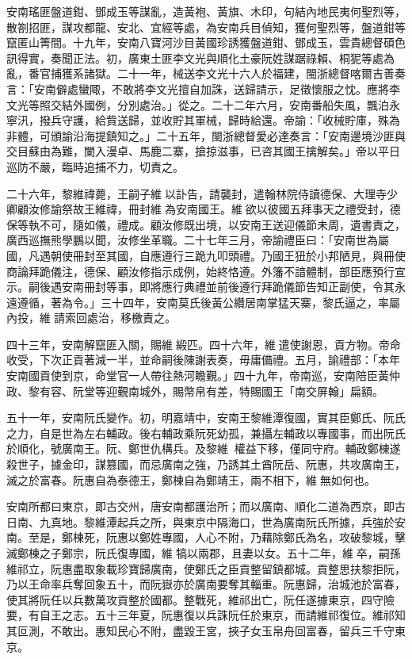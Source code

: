 \begin{pinyinscope}
安南瑤匪盤道鉗、鄧成玉等謀亂，造黃袍、黃旗、木印，句結內地民夷何聖烈等，散劄招匪，謀攻都龍、安北、宜經等處，為安南兵目偵知，獲何聖烈等，盤道鉗等竄匿山箐間。十九年，安南八寶河沙目黃國珍誘獲盤道鉗、鄧成玉，雲貴總督碩色訊得實，奏聞正法。初，廣東土匪李文光與順化土豪阮姓謀踞祿賴、桐狔等處為亂，番官捕獲系諸獄。二十一年，械送李文光十六人於福建，閩浙總督喀爾吉善奏言：「安南僻處蠻陬，不敢將李文光擅自加誅，送歸請示，足徵懷服之忱。應將李文光等照交結外國例，分別處治。」從之。二十二年六月，安南番船失風，飄泊永寧汛，撥兵守護，給貲送歸，並收貯其軍械，歸時給還。帝諭：「收械貯庫，殊為非體，可頒諭沿海提鎮知之。」二十五年，閩浙總督愛必達奏言：「安南邊境沙匪與交目蘇由為難，闌入漫卓、馬鹿二寨，搶掠滋事，已咨其國王擒解矣。」帝以平日巡防不嚴，臨時追捕不力，切責之。

二十六年，黎維禕薨，王嗣子維以訃告，請襲封，遣翰林院侍讀德保、大理寺少卿顧汝修諭祭故王維禕，冊封維為安南國王。維欲以彼國五拜事天之禮受封，德保等執不可，隨如儀，禮成。顧汝修既出境，以安南王送迎儀節未周，遺書責之，廣西巡撫熊學鵬以聞，汝修坐革職。二十七年三月，帝諭禮臣曰：「安南世為屬國，凡遇朝使冊封至其國，自應遵行三跪九叩頭禮。乃國王狃於小邦陋見，與冊使商論拜跪儀注，德保、顧汝修指示成例，始終恪遵。外籓不諳體制，部臣應預行宣示。嗣後遇安南冊封等事，即將應行典禮並前後遵行拜跪儀節告知正副使，令其永遠遵循，著為令。」三十四年，安南莫氏後黃公纘居南掌猛天寨，黎氏逼之，率屬內投，維請索回處治，移檄責之。

四十三年，安南解竄匪入關，賜維緞匹。四十六年，維遣使謝恩，貢方物。帝命收受，下次正貢著減一半，並命嗣後陳謝表奏，毋庸備禮。五月，諭禮部：「本年安南國貢使到京，命堂官一人帶往熱河瞻覲。」四十九年，帝南巡，安南陪臣黃仲政、黎有容、阮堂等迎覲南城外，賜幣帛有差，特賜國王「南交屏翰」扁額。

五十一年，安南阮氏變作。初，明嘉靖中，安南王黎維潭復國，實其臣鄭氏、阮氏之力，自是世為左右輔政。後右輔政乘阮死幼孤，兼攝左輔政以專國事，而出阮氏於順化，號廣南王。阮、鄭世仇構兵。及黎維，權益下移，僅同守府。輔政鄭棟遂殺世子，據金印，謀篡國，而忌廣南之強，乃誘其土酋阮岳、阮惠，共攻廣南王，滅之於富春。阮惠自為泰德王，鄭棟自為鄭靖王，兩不相下，維無如何也。

安南所都曰東京，即古交州，唐安南都護治所；而以廣南、順化二道為西京，即古日南、九真地。黎維潭起兵之所，與東京中隔海口，世為廣南阮氏所據，兵強於安南。至是，鄭棟死，阮惠以鄭姓專國，人心不附，乃藉除鄭氏為名，攻破黎城，擊滅鄭棟之子鄭宗，阮氏復專國，維犒以兩郡，且妻以女。五十二年，維卒，嗣孫維祁立，阮惠盡取象載珍寶歸廣南，使鄭氏之臣貢整留鎮都城。貢整思扶黎拒阮，乃以王命率兵奪回象五十，而阮嶽亦於廣南要奪其輜重。阮惠歸，治城池於富春，使其將阮任以兵數萬攻貢整於國都。整戰死，維祁出亡，阮任遂據東京，四守險要，有自王之志。五十三年夏，阮惠復以兵誅阮任於東京，而請維祁復位。維祁知其叵測，不敢出。惠知民心不附，盡毀王宮，挾子女玉帛舟回富春，留兵三千守東京。


\end{pinyinscope}
